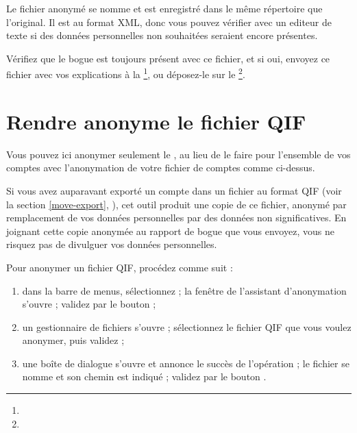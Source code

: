 Le fichier anonymé se nomme  et est enregistré dans le même répertoire que l'original. Il est au format XML, donc vous pouvez vérifier avec un \gls{editeur de texte} si des données personnelles non souhaitées seraient encore présentes.

Vérifiez que le bogue est toujours présent avec ce fichier, et si oui, envoyez ce fichier avec vos explications à la \footnote{\urlListBugsreport{}}, ou déposez-le sur le  \footnote{\urlTuxFamilyMantis{}}.

 
\section{Rendre anonyme le fichier QIF\label{maintenance-QIF-anonymous}}


Vous pouvez ici anonymer seulement le , au lieu de le faire pour l'ensemble de vos comptes avec l'anonymation de votre fichier de comptes comme ci-dessus.

Si vous avez auparavant exporté un compte dans un fichier au format QIF (voir la section \vref{move-export}, ), cet outil produit une copie de ce fichier, anonymé par remplacement de vos données personnelles par des données non significatives. En joignant cette copie anonymée au rapport de bogue que vous envoyez, vous ne risquez pas de divulguer vos données personnelles.

Pour anonymer un fichier QIF, procédez comme suit :

\begin{enumerate}
	\item dans la barre de menus, sélectionnez  ; la fenêtre de l'assistant d'anonymation s'ouvre ; validez par le bouton  ;
	\item un gestionnaire de fichiers s'ouvre ; sélectionnez le fichier QIF que vous voulez anonymer, puis validez ;
	\item une boîte de dialogue s'ouvre et annonce le succès de l'opération ; le fichier se nomme  et son chemin est indiqué ; validez par le bouton .
\end{enumerate}

